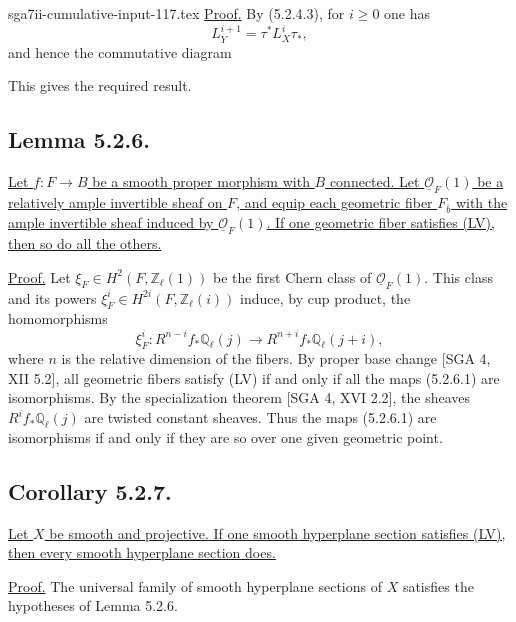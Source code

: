 \begin{filecontents*}{sga7ii-cumulative-input-117.tex}
\underline{Proof.}
By (5.2.4.3), for $i\geq0$ one has
\[
L_Y^{i+1}=\tau^*L_X^i\tau_*,
\]
and hence the commutative diagram
\begin{center}
\end{center}
This gives the required result.

\subsection*{Lemma 5.2.6.}
\underline{Let $f:F\to B$ be a smooth proper morphism with $B$ connected.
Let $\underline{\mathcal O}_F(1)$ be a relatively ample invertible sheaf on
$F$, and equip each geometric fiber $F_{\bar b}$ with the ample invertible
sheaf induced by $\underline{\mathcal O}_F(1)$.  If one geometric fiber
satisfies (LV), then so do all the others.}

\underline{Proof.}
Let
$\xi_F\in H^2(F,\mathbb Z_\ell(1))$ be the first Chern class of
$\underline{\mathcal O}_F(1)$.  This class and its powers
$\xi_F^i\in H^{2i}(F,\mathbb Z_\ell(i))$ induce, by cup product, the
homomorphisms
\begin{equation}\tag{5.2.6.1}
\xi_F^i:R^{n-i}f_*\mathbb Q_\ell(j)
\longrightarrow R^{n+i}f_*\mathbb Q_\ell(j+i),
\end{equation}
where $n$ is the relative dimension of the fibers.  By proper base change
[SGA 4, XII 5.2], all geometric fibers satisfy (LV) if and only if all the
maps (5.2.6.1) are isomorphisms.  By the specialization theorem
[SGA 4, XVI 2.2], the sheaves $R^if_*\mathbb Q_\ell(j)$ are twisted constant
sheaves.  Thus the maps (5.2.6.1) are isomorphisms if and only if they are so
over one given geometric point.

\subsection*{Corollary 5.2.7.}
\underline{Let $X$ be smooth and projective.  If one smooth hyperplane
section satisfies (LV), then every smooth hyperplane section does.}

\underline{Proof.}
The universal family of smooth hyperplane sections of $X$ satisfies the
hypotheses of Lemma 5.2.6.
\end{filecontents*}
